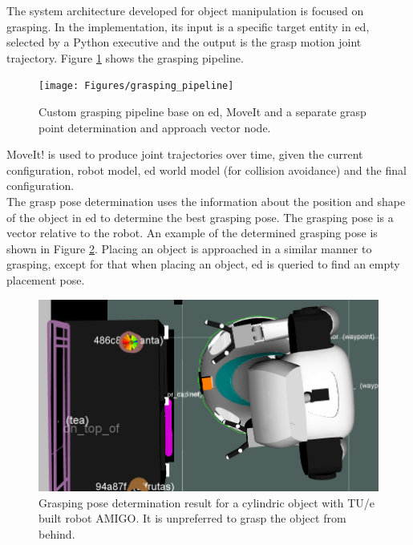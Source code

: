 The system architecture developed for object manipulation is focused on grasping. In the implementation, its input is a specific target entity in \acrshort{ed}, selected by a Python executive and the output is the grasp motion joint trajectory.
Figure \ref{fig:grasping_pipeline} shows the grasping pipeline.
\begin{figure}[H]
    \centering
	\texttt{[image: Figures/grasping\_pipeline]}
	\caption{Custom grasping pipeline base on \acrshort{ed}, MoveIt and a separate grasp point determination and approach vector node.}
	\label{fig:grasping_pipeline}
\end{figure}
MoveIt! is used to produce joint trajectories over time, given the current configuration, robot model, \acrshort{ed} world model (for collision avoidance) and the final configuration.
\\
The grasp pose determination uses the information about the position and shape of the object in \acrshort{ed} to determine the best grasping pose.
The grasping pose is a vector relative to the robot.
An example of the determined grasping pose is shown in Figure \ref{fig:grasping_pose_determination}.
Placing an object is approached in a similar manner to grasping, except for that when placing an object, \acrshort{ed} is queried to find an empty placement pose.
\begin{figure}[H]
   \centering
   \includegraphics[width = 0.8\linewidth]{Figures/grasp_point_determination}
	\caption{Grasping pose determination result for a cylindric object with TU/e built robot AMIGO. It is unpreferred to grasp the object from behind.}
	\label{fig:grasping_pose_determination}
\end{figure}
